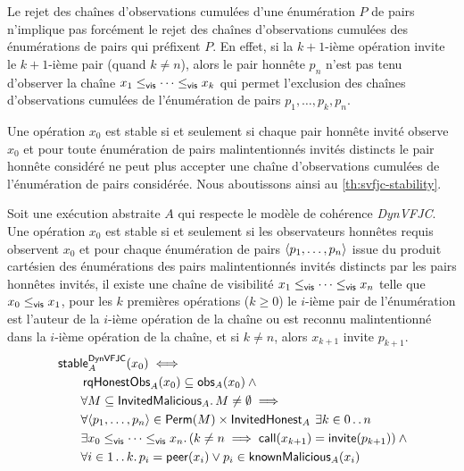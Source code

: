 Le rejet des chaînes d'observations cumulées d'une énumération $P$ de pairs n'implique pas forcément le rejet des chaînes d'observations cumulées des énumérations de pairs qui préfixent $P$.
En effet, si la $k+1$-ième opération invite le $k+1$-ième pair (quand $k \neq n$), alors le pair honnête $p_n$ n'est pas tenu d'observer la chaîne $x_1 \viseq \dotsb \viseq x_k$ qui permet l'exclusion des chaînes d'observations cumulées de l'énumération de pairs $p_1, \dotsc, p_k, p_n$.

Une opération $x_0$ est stable si et seulement si chaque pair honnête invité observe $x_0$ et pour toute énumération de pairs malintentionnés invités distincts le pair honnête considéré ne peut plus accepter une chaîne d'observations cumulées de l'énumération de pairs considérée.
Nous aboutissons ainsi au \autoref{th:svfjc-stability}.


\begin{theorem}\label{th:svfjc-stability}
Soit une exécution abstraite $A$ qui respecte le modèle de cohérence \emph{DynVFJC}.
Une opération $x_0$ est stable si et seulement si les observateurs honnêtes requis observent $x_0$ et pour chaque énumération de pairs $\tuple*{p_1, \dotsc, p_n}$ issue du produit cartésien des énumérations des pairs malintentionnés invités distincts par les pairs honnêtes invités, il existe une chaîne de visibilité $x_1 \viseq \dotsb \viseq x_n$ telle que $x_0 \viseq x_1$, pour les $k$ premières opérations ($k \geq 0$) le $i$-ième pair de l'énumération est l'auteur de la $i$-ième opération de la chaîne ou est reconnu malintentionné dans la $i$-ième opération de la chaîne, et si $k \neq n$, alors $x_{k+1}$ invite $p_{k+1}$.
\begin{equation*}\begin{split}
\MoveEqLeft\trm{stable}_A^{\trm{DynVFJC}}(x_0) \iff\\
    &\trm{rqHonestObs}_A(x_0) \subseteq \trm{obs}_A(x_0) \:\land \\
    &\forall M \subseteq \trm{InvitedMalicious}_A \qsep M \neq \emptyset \implies \\
    &\forall \tuple*{p_1, \dotsc, p_n} \in \trm{Perm}(M) \times \trm{InvitedHonest}_A
    \:\exists k \in \irange{0}{n} \\
    & \exists x_0 \viseq \dotsb \viseq x_n \qsep
    (k \neq n \implies \trm{call}(x_{k+1}) = \trm{invite}(p_{k+1})) \:\land\\
    &\forall i \in \irange{1}{k} \qsep p_i = \trm{peer}(x_i) \lor p_i \in \trm{knownMalicious}_A(x_i)
\end{split}\end{equation*}
\end{theorem}



